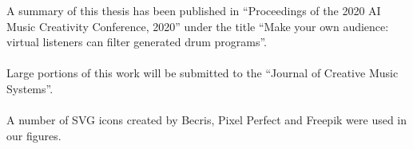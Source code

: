 \documentclass[\main/thesis.tex]{subfiles}
\begin{document}
\begin{acknowledgements} 

A summary of this thesis has been published in \enquote{Proceedings of the 2020 AI Music Creativity Conference, 2020} under the title \enquote{Make your own audience: virtual listeners can filter generated drum programs}.\\\\
Large portions of this work will be submitted to the \enquote{Journal of Creative Music Systems}.\\\\
A number of SVG icons created by Becris, Pixel Perfect and Freepik were used in our figures.\\\\ 

\end{acknowledgements}
\end{document}
